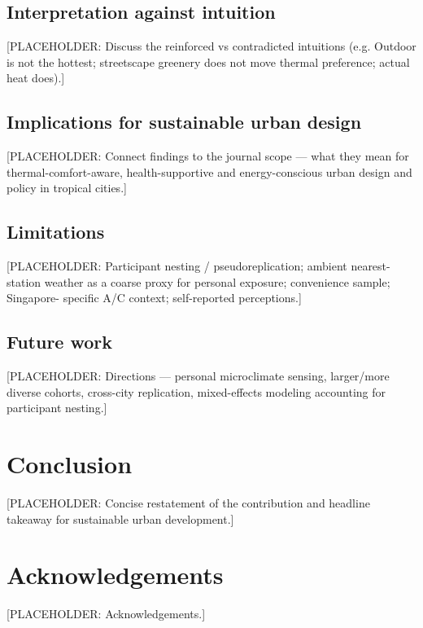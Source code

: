 \documentclass[]{interact}
\begin{document}
\subsection{Interpretation against intuition}\label{sec:disc-intuition}
[PLACEHOLDER: Discuss the reinforced vs contradicted intuitions (e.g. Outdoor is
not the hottest; streetscape greenery does not move thermal preference; actual
heat does).]

\subsection{Implications for sustainable urban design}\label{sec:disc-implications}
[PLACEHOLDER: Connect findings to the journal scope --- what they mean for
thermal-comfort-aware, health-supportive and energy-conscious urban design and
policy in tropical cities.]

\subsection{Limitations}\label{sec:disc-limitations}
[PLACEHOLDER: Participant nesting / pseudoreplication; ambient nearest-station
weather as a coarse proxy for personal exposure; convenience sample; Singapore-
specific A/C context; self-reported perceptions.]

\subsection{Future work}\label{sec:disc-future}
[PLACEHOLDER: Directions --- personal microclimate sensing, larger/more diverse
cohorts, cross-city replication, mixed-effects modeling accounting for
participant nesting.]


\section{Conclusion}\label{sec:conclusion}
[PLACEHOLDER: Concise restatement of the contribution and headline takeaway for
sustainable urban development.]


\section*{Acknowledgements}
[PLACEHOLDER: Acknowledgements.]
\end{document}
